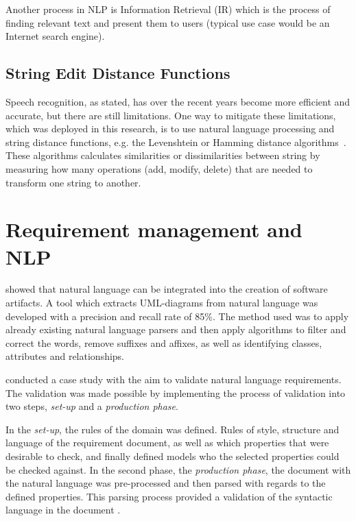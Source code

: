 Another process in NLP is Information Retrieval (IR) which is the process of finding relevant text and present them to users (typical use case would be an Internet search engine). 

\subsection{String Edit Distance Functions}
\label{subsec:sedf}
Speech recognition, as stated, has over the recent years become more efficient and accurate, but there are still limitations.
One way to mitigate these limitations, which was deployed in this research, is to use natural language processing and string distance functions, e.g. the Levenshtein or Hamming distance algorithms~\citep{levenshtein,hamming}. 
These algorithms calculates similarities or dissimilarities between string by measuring how many operations (add, modify, delete) that are needed to transform one string to another.

\section{Requirement management and NLP}
\citet{joshi2012} showed that natural language can be integrated into the creation of software artifacts. A tool which extracts UML-diagrams from natural language was developed with a precision and recall rate of 85\%. The method used was to apply already existing natural language parsers and then apply algorithms to filter and correct the words, remove suffixes and affixes, as well as identifying classes, attributes and relationships.

\citet{gervasi2002} conducted a case study with the aim to validate natural language requirements. The validation was made possible by implementing the process of validation into two steps, \emph{set-up} and a \emph{production phase}. 

In the \emph{set-up}, the rules of the domain was defined. Rules of style, structure and language of the requirement document, as well as which properties that were desirable to check, and finally defined models who the selected properties could be checked against. In the second phase, the \emph{production phase}, the document with the natural language was pre-processed and then parsed with regards to the defined properties. This parsing process provided a validation of the syntactic language in the document \citep{gervasi2002}.

